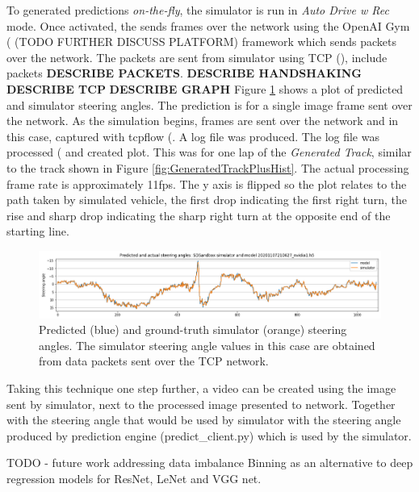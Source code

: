 To generated predictions \textit{on-the-fly}, the simulator is run in \textit{Auto Drive w Rec} mode. Once activated, the sends frames over the network using the OpenAI Gym (\cite{brockman2016openai} (TODO FURTHER DISCUSS PLATFORM) framework which sends packets over the network. The packets are sent from simulator using TCP (\cite{rfc793}), include packets \textbf{DESCRIBE PACKETS}.  
\textbf{DESCRIBE HANDSHAKING} \textbf{DESCRIBE TCP} 
\textbf{DESCRIBE GRAPH}
Figure \ref{fig:PredSteeringAnglestcpflowNvidia1} shows a plot of predicted and simulator steering angles. The prediction is for a single image frame sent over the network. As the simulation begins, frames are sent over the network and in this case, captured with tcpflow (\cite{garfinkel2013passive}. A log file was produced. The log file was processed (\cite{JUPYTERNOTEBOOKINAPPENDIX} and created plot. This was for one lap of the \textit{Generated Track}, similar to the track shown in Figure \ref{fig:GeneratedTrackPlusHist}. The actual processing frame rate is approximately 11fps. The y axis is flipped so the plot relates to the path taken by simulated vehicle, the first drop indicating the first right turn, the rise and sharp drop indicating the sharp right turn at the opposite end of the starting line.

\begin{figure}[ht]
 \centering 
 \includegraphics[width=\textwidth]{Figures/PredSteeringAnglestcpflowNvidia1.png}
 \caption{Predicted (blue) and ground-truth simulator (orange) steering angles. The simulator steering angle values in this case are obtained from data packets sent over the TCP network.}
 \label{fig:PredSteeringAnglestcpflowNvidia1}
\end{figure}

Taking this technique one step further, a video can be created using the image sent by simulator, next to the processed image presented to network. Together with the steering angle that would be used by simulator with the steering angle produced by prediction engine (predict\_client.py) which is used by the simulator.


TODO - future work
addressing data imbalance
Binning as an alternative to deep regression models for ResNet, LeNet and VGG net. 
